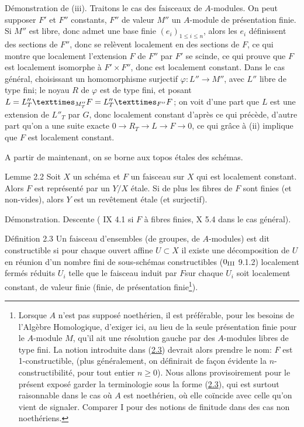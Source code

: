 \documentclass[10pt]{../fichiers-configuration-latex/smfart}
\begin{document}
Démonstration de (iii). Traitons le cas des faisceaux de
$A$-modules. On peut supposer $F'$ et $F''$ constants, $F''$ de valeur
$M''$ un $A$-module de présentation finie. Si $M''$ est libre, donc
admet une base finie $(e_i)_{1\leq i\leq n}$, alors les $e_i$
définissent des sections de $F''$, donc se relèvent localement en des
sections de $F$, ce qui montre que localement l'extension $F$ de $F''$
par $F'$ se scinde, ce qui prouve que $F$ est localement isomorphe à
$F'\times F''$, donc est localement constant. Dans le cas général,
choisissant un homomorphisme surjectif $\varphi:L''\rightarrow M''$,
avec $L''$ libre de type fini; le noyau $R$ de $\varphi$ est de type
fini, et posant $L=\fprod{L''_T}{F}{M''_T}=\fprod{L''_T}{F}{F''}$; on
voit d'une part que $L$ est une extension de $L''_T$ par $G$, donc
localement constant d'après ce qui précède, d'autre part qu'on a une
suite exacte $0\rightarrow R_T\rightarrow L\rightarrow F\rightarrow
0$, ce qui grâce à (ii) implique que $F$ est localement constant.

A partir de maintenant, on se borne aux topos étales des schémas.

\begin{enonce*}{Lemme 2.2}
Soit $X$ un schéma et $F$ un faisceau sur $X$ qui est localement
constant. Alors $F$ est représenté par un $Y/X$ étale. Si de plus les
fibres de $F$ sont finies (\resp et non-vides), alors $Y$ est un
revêtement étale (\resp et surjectif).
\end{enonce*}

Démonstration. Descente ( IX 4.1 si $F$ à fibres finies,  X
5.4 dans le cas général).

\begin{enonce*}{Définition 2.3}
Un faisceau d'ensembles (\resp de groupes, \resp de $A$-modules) est
dit constructible si pour chaque ouvert affine $U\subset X$ il existe
une décomposition de $U$ en réunion d'un nombre fini de sous-schémas
constructibles {\rm (\EGA $0_{{\rm III}}$ 9.1.2)} localement fermés
réduits $U_i$ telle que le faisceau induit par $F$\pageoriginale sur
chaque $U_i$ soit localement constant, de valeur finie (\resp finie,
\resp de présentation finie\footnote[1]{Lorsque $A$ n'est pas
  supposé noethérien, il est préférable, pour les besoins de l'Algèbre
Homologique, d'exiger ici, au lieu de la seule présentation finie pour
le $A$-module $M$, qu'il ait une résolution gauche par des $A$-modules
libres de type fini. La notion introduite dans (\hyperref[IX.def2.3]{2.3}) devrait alors
prendre le nom: $F$ est 1-constructible, (plus généralement, on
définirait de façon évidente la $n$-constructibilité, pour tout
entier $n\geq 0$). Nous allons provisoirement pour le présent exposé
garder la terminologie sous la forme (\hyperref[IX.def2.3]{2.3}), qui est surtout
raisonnable dans le cas où $A$ est noethérien, où elle coïncide avec
celle qu'on vient de signaler. Comparer  I pour des notions de
finitude dans des cas non noethériens.}).
\end{enonce*}
\end{document}

